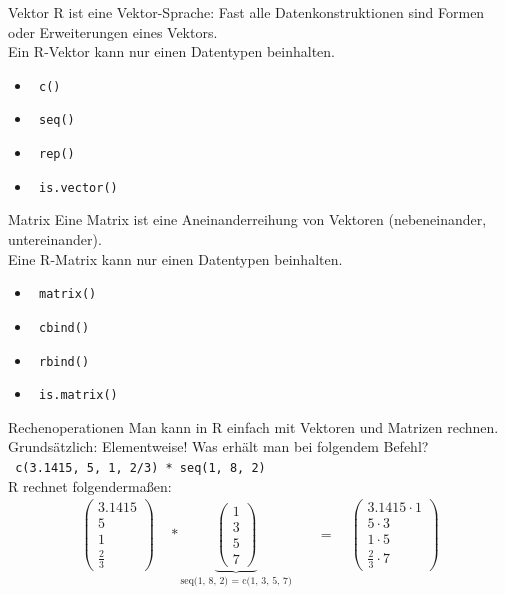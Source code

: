 \documentclass[aspectratio = 169]{chariteBeamer}
\begin{document}
\begin{frame}[fragile]{Vektor}
	R ist eine Vektor-Sprache: Fast alle Datenkonstruktionen sind Formen oder Erweiterungen eines Vektors. \\
	Ein R-Vektor kann nur einen Datentypen beinhalten.
	\begin{itemize}
		\item \verb+ c()+
		\item \verb+ seq()+
		\item \verb+ rep()+
		\item \verb+ is.vector()+
	\end{itemize}
\end{frame}

\begin{frame}[fragile]{Matrix}
	Eine Matrix ist eine Aneinanderreihung von Vektoren (nebeneinander, untereinander). \\
	Eine R-Matrix kann nur einen Datentypen beinhalten.
	\begin{itemize}
		\item \verb+ matrix()+
		\item \verb+ cbind()+
		\item \verb+ rbind()+
		\item \verb+ is.matrix()+
	\end{itemize}
\end{frame}

\begin{frame}[fragile]{Rechenoperationen}
Man kann in R einfach mit Vektoren und Matrizen rechnen.  Grundsätzlich: Elementweise! Was erhält man bei folgendem Befehl? \\
\verb+ c(3.1415, 5, 1, 2/3) * seq(1, 8, 2)+ \\
R rechnet folgendermaßen: \begin{align*}
	\begin{pmatrix}
	3.1415 \\ 5 \\ 1 \\ \frac{2}{3}
	\end{pmatrix} \quad * 
	\underbrace{\begin{pmatrix}
		1 \\ 3 \\ 5 \\ 7
	\end{pmatrix}}_{\text{seq(1, 8, 2) = c(1, 3, 5, 7)}}
	\quad &= \quad \begin{pmatrix}
	3.1415 \cdot 1 \\
	5 \cdot 3 \\
	1 \cdot 5 \\
	\frac{2}{3} \cdot 7
	\end{pmatrix}
\end{align*}
\end{frame}
\end{document}
